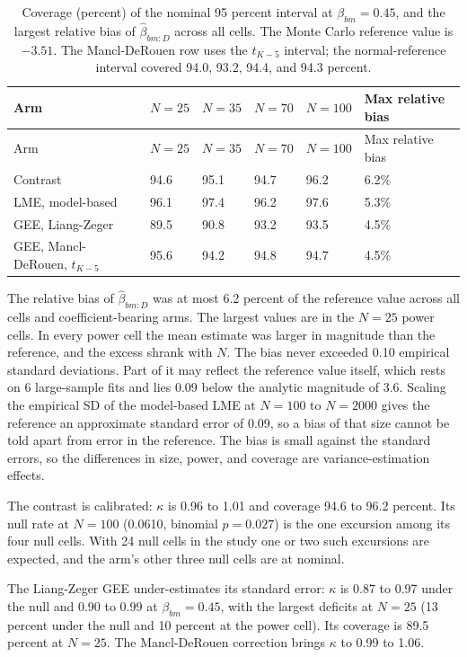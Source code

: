 \documentclass[
  11pt,
]{article}
\begin{document}
\begin{longtable}[]{@{}llllll@{}}
\caption{\label{tab:secondary} Coverage (percent) of the nominal 95 percent interval at \(\beta_{bm} = 0.45\), and the largest relative bias of \(\hat\beta_{bm:D}\) across all cells. The Monte Carlo reference value is \(-3.51\). The Mancl-DeRouen row uses the \(t_{K-5}\) interval; the normal-reference interval covered 94.0, 93.2, 94.4, and 94.3 percent.}\tabularnewline
\toprule\noalign{}
Arm & \(N = 25\) & \(N = 35\) & \(N = 70\) & \(N = 100\) & Max relative bias \\
\midrule\noalign{}
\endfirsthead
\toprule\noalign{}
Arm & \(N = 25\) & \(N = 35\) & \(N = 70\) & \(N = 100\) & Max relative bias \\
\midrule\noalign{}
\endhead
\bottomrule\noalign{}
\endlastfoot
Contrast & 94.6 & 95.1 & 94.7 & 96.2 & 6.2\% \\
LME, model-based & 96.1 & 97.4 & 96.2 & 97.6 & 5.3\% \\
GEE, Liang-Zeger & 89.5 & 90.8 & 93.2 & 93.5 & 4.5\% \\
GEE, Mancl-DeRouen, \(t_{K-5}\) & 95.6 & 94.2 & 94.8 & 94.7 & 4.5\% \\
\end{longtable}

The relative bias of \(\hat\beta_{bm:D}\) was at most
6.2 percent of the
reference value across all cells and coefficient-bearing arms. The
largest values are in the \(N = 25\) power cells. In every power cell
the mean estimate was larger in magnitude than the reference, and
the excess shrank with \(N\). The bias never exceeded
0.10 empirical standard
deviations. Part of it may reflect the reference value itself,
which rests on 6 large-sample fits and lies
0.09 below the analytic magnitude
of 3.6. Scaling the empirical SD of the model-based
LME at \(N = 100\) to \(N = 2000\) gives the
reference an approximate standard error of 0.09, so a
bias of that size cannot be told apart from error in the reference.
The bias is small against the standard
errors, so the differences in size, power, and coverage are
variance-estimation effects.

The contrast is calibrated: \(\kappa\) is
0.96 to 1.01
and coverage 94.6 to 96.2
percent. Its null rate at \(N = 100\)
(0.0610, binomial
\(p = 0.027\)) is the one excursion among
its four null cells. With 24 null cells in the study
one or two such
excursions are expected, and the arm's other three null cells are at
nominal.

The Liang-Zeger GEE under-estimates its standard error: \(\kappa\) is
0.87 to 0.97 under the null and
0.90 to 0.99 at \(\beta_{bm} = 0.45\), with the
largest deficits at \(N = 25\)
(13 percent under the
null and 10 percent at
the power cell). Its coverage is 89.5
percent at \(N = 25\). The Mancl-DeRouen correction brings \(\kappa\) to
0.99 to 1.06.
\end{document}
